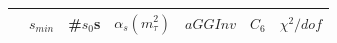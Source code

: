 \documentclass[../../index.tex]{subfiles}
\begin{document}
\begin{table}
  \centering
  \begin{tabular}{lllllll}
    \toprule
    & \(s_{min}\) & \#\(s_0\)s & \(\alpha_s(m_\tau^2)\) & \(aGGInv\) & \(C_{6}\) & \(\chi^2/dof\)  \\
    \midrule



\end{tabular}
\end{table}
\end{document}
